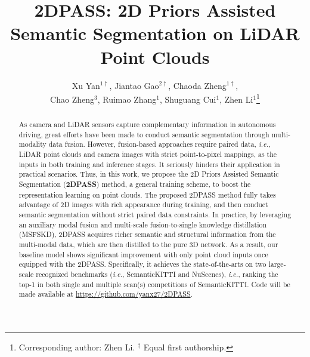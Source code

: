 \documentclass[runningheads]{llncs}
\begin{document}
	\pagestyle{headings}
	\mainmatter
	\def\ECCV16SubNumber{755}  

	\title{2DPASS: 2D Priors Assisted Semantic Segmentation on LiDAR Point Clouds} 

	
	
\author{Xu Yan$^{1\dagger}$, Jiantao Gao$^{2\dagger}$, Chaoda Zheng$^{1\dagger}$,  \\Chao Zheng$^{3}$, Ruimao Zhang$^{1}$, Shuguang Cui$^{1}$,  Zhen Li$^{1}$\thanks{{ Corresponding author: Zhen Li. $^\dagger$ Equal first authorship.}} 
}
	
	\def\etal{\textit{et.al.}}
	\def\eg{{\textit{e.g.}}}
	\def\ie{{\textit{i.e.}}}
	
	\maketitle
	\begin{abstract}
		As camera and LiDAR sensors capture complementary information in autonomous driving, great efforts have been made to conduct semantic segmentation through multi-modality data fusion.
However, fusion-based approaches require paired data, \ie, LiDAR point clouds and camera images with strict point-to-pixel mappings, as the inputs in both training and inference stages.
It seriously hinders their application in practical scenarios.
Thus, in this work, we propose the {2D Priors Assisted Semantic Segmentation} ({\textbf{2DPASS}}) method, a general training scheme, to boost the representation learning on point clouds.
The proposed 2DPASS method fully takes advantage of 2D images with rich appearance during training, and then conduct semantic segmentation without strict paired data constraints.
In practice, by leveraging an auxiliary modal fusion and multi-scale fusion-to-single knowledge distillation (MSFSKD), 2DPASS acquires richer semantic and structural information from the multi-modal data, which are then distilled to the pure 3D network.
As a result, our baseline model shows significant improvement with only point cloud inputs once equipped with the 2DPASS. 
Specifically, it achieves the state-of-the-arts on two large-scale recognized benchmarks (\ie, SemanticKITTI and NuScenes), \ie, ranking the top-1 in both single and multiple scan(s) competitions of SemanticKITTI.
Code will be made available at \url{https://github.com/yanx27/2DPASS}.
		
		
	\end{abstract}
	
\end{document}
